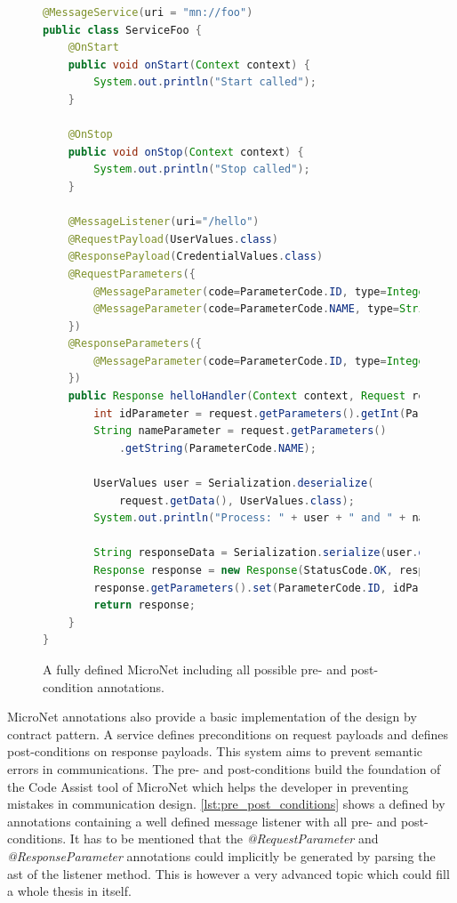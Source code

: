\begin{figure}
\begin{lstlisting}[language=Java,firstnumber=1] 
@MessageService(uri = "mn://foo")
public class ServiceFoo {
	@OnStart
	public void onStart(Context context) {
		System.out.println("Start called");
	}
	
	@OnStop
	public void onStop(Context context) {
		System.out.println("Stop called");
	}
	
	@MessageListener(uri="/hello")
	@RequestPayload(UserValues.class) 
	@ResponsePayload(CredentialValues.class)
	@RequestParameters({
		@MessageParameter(code=ParameterCode.ID, type=Integer.class),
		@MessageParameter(code=ParameterCode.NAME, type=String.class)
	})
	@ResponseParameters({
		@MessageParameter(code=ParameterCode.ID, type=Integer.class),
	})
	public Response helloHandler(Context context, Request request) {
		int idParameter = request.getParameters().getInt(ParameterCode.ID);
		String nameParameter = request.getParameters()
			.getString(ParameterCode.NAME);
		
		UserValues user = Serialization.deserialize(
			request.getData(), UserValues.class);
		System.out.println("Process: " + user + " and " + nameParameter);

		String responseData = Serialization.serialize(user.getCredentials());
		Response response = new Response(StatusCode.OK, responseData);
		response.getParameters().set(ParameterCode.ID, idParameter);
		return response;
	}
}
\end{lstlisting}
\caption{A fully defined MicroNet \ms{} including all possible pre- and
post-condition annotations.}
\label{lst:pre_post_conditions}
\end{figure}

MicroNet annotations also provide a basic implementation of the design by
contract pattern. A service defines preconditions on request payloads and
defines post-conditions on response payloads. This system aims to prevent
semantic errors in communications. The pre- and post-conditions build the
foundation of the Code Assist tool of MicroNet which helps the developer in
preventing mistakes in \ms{} communication design.
\autoref{lst:pre_post_conditions} shows a \ms{} defined by annotations
containing a well defined message listener with all pre- and post-conditions. It
has to be mentioned that the \textit{@RequestParameter} and
\textit{@ResponseParameter} annotations could implicitly be generated by parsing
the \gls{ast} of the listener method. This is however a very advanced
topic which could fill a whole thesis in itself.
 
